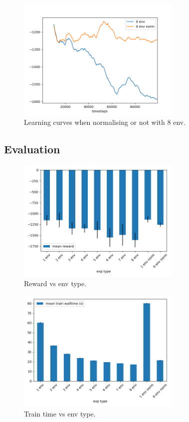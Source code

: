 \documentclass{article}
\begin{document}
\begin{figure}[H]
    \centering
    \includegraphics[width=0.7\textwidth]{../learning_curves_norm8.png}
\caption{Learning curves when normalising or not with 8 env.}
\end{figure}



\subsection{Evaluation}


\begin{figure}[H]
    \centering
    \includegraphics[width=0.7\textwidth]{../reward_by_exp_type.png}
\caption{Reward vs env type.}
\end{figure}

\begin{figure}[H]
    \centering
    \includegraphics[width=0.7\textwidth]{../train_time_by_exp_type.png}
\caption{Train time vs env type.}
\end{figure}
\end{document}
